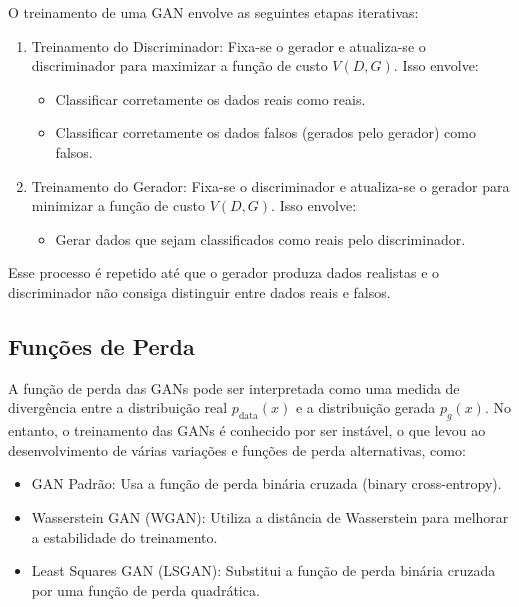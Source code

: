 \documentclass[a4paper]{tufte-handout}
\begin{document}
O treinamento de uma GAN envolve as seguintes etapas iterativas:
\begin{enumerate}
    \item Treinamento do Discriminador: Fixa-se o gerador e atualiza-se o discriminador para maximizar a função de custo $V(D, G)$. Isso envolve:
    \begin{itemize}
        \item Classificar corretamente os dados reais como reais.
        \item Classificar corretamente os dados falsos (gerados pelo gerador) como falsos.
    \end{itemize}
    \item Treinamento do Gerador: Fixa-se o discriminador e atualiza-se o gerador para minimizar a função de custo $V(D, G)$. Isso envolve:
    \begin{itemize}
        \item Gerar dados que sejam classificados como reais pelo discriminador.

    \end{itemize}
\end{enumerate}
Esse processo é repetido até que o gerador produza dados realistas e o discriminador não consiga distinguir entre dados reais e falsos.



\subsection{Funções de Perda}

A função de perda das GANs pode ser interpretada como uma medida de divergência entre a distribuição real $p_{\text{data}}(x)$ e a distribuição gerada $p_g(x)$. No entanto, o treinamento das GANs é conhecido por ser instável, o que levou ao desenvolvimento de várias variações e funções de perda alternativas, como:
\begin{itemize}
    \item GAN Padrão: Usa a função de perda binária cruzada (binary cross-entropy).
    \item Wasserstein GAN (WGAN): Utiliza a distância de Wasserstein para melhorar a estabilidade do treinamento.
    \item Least Squares GAN (LSGAN): Substitui a função de perda binária cruzada por uma função de perda quadrática.    
\end{itemize}


\end{document}
